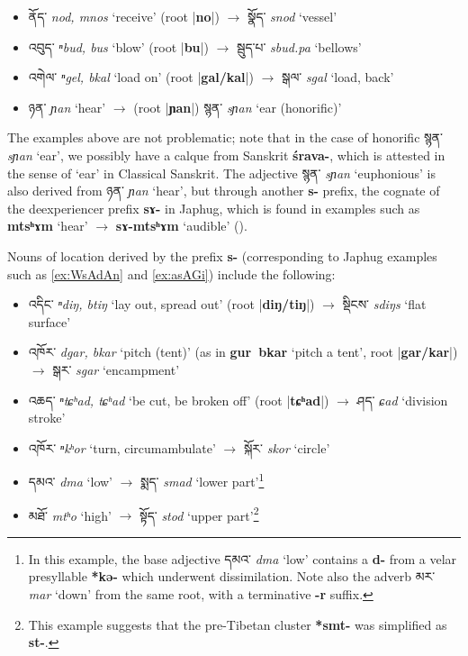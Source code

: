 \documentclass[oneside,a4paper,11pt]{article}
\newcommand{\ipa}[1]{\textbf{{\phon\mbox{#1}}}} %
\newcommand{\tibet}[3]{{\tibetain#1} \textit{\phon#2} `#3'}
\newcommand{\dhat}[1]{|\ipa{#1}|}
\begin{document}
\begin{itemize}
\item \tibet{ནོད་}{nod, mnos}{receive} (root \dhat{no}) $\rightarrow$	\tibet{སྣོད་}{snod}{vessel} 	
\item \tibet{འབུད་}{ⁿbud, bus}{blow} (root \dhat{bu}) $\rightarrow$	\tibet{སྦུད་པ་}{sbud.pa}{bellows} 
\item \tibet{འགེལ་}{ⁿgel, bkal}{load on} (root \dhat{gal/kal}) $\rightarrow$	\tibet{སྒལ་}{sgal}{load, back} 
\item \tibet{ཉན་}{ɲan}{hear} $\rightarrow$	(root \dhat{ɲan}) \tibet{སྙན་}{sɲan}{ear (honorific)} 
\end{itemize}

The examples above are not problematic; note that in the case of honorific \tibet{སྙན་}{sɲan}{ear}, we possibly have a calque from Sanskrit \ipa{śrava-}, which is attested in the sense of `ear' in Classical Sanskrit. The adjective \tibet{སྙན་}{sɲan}{euphonious} is also derived from \tibet{ཉན་}{ɲan}{hear}, but through another \ipa{s-} prefix, the cognate of the deexperiencer prefix \ipa{sɤ-} in Japhug, which is found in examples such as \ipa{mtsʰɤm} `hear' $\rightarrow$  \ipa{sɤ-mtsʰɤm} `audible' (\citealt{jacques12demotion}).

Nouns of location derived by the prefix \ipa{s-} (corresponding to Japhug examples such as \ref{ex:WsAdAn} and \ref{ex:asAGi}) include the following:

\begin{itemize}
\item \tibet{འདིང་}{ⁿdiŋ, btiŋ}{lay out, spread out} (root \dhat{diŋ/tiŋ}) $\rightarrow$	\tibet{སྡིངས་}{sdiŋs}{flat surface} 
\item \tibet{འཁོར་}{dgar, bkar}{pitch (tent)} (as in \ipa{gur bkar} `pitch a tent', root \dhat{gar/kar}) $\rightarrow$	\tibet{སྒར་}{sgar}{encampment} 
\item \tibet{འཆད་}{ⁿtɕʰad, tɕʰad}{be cut, be broken off} (root \dhat{tɕʰad}) $\rightarrow$	\tibet{ཤད་}{ɕad}{division stroke} 
\item \tibet{འཁོར་}{ⁿkʰor}{turn, circumambulate} $\rightarrow$	\tibet{སྐོར་}{skor}{circle} 
\item \tibet{དམའ་}{dma}{low} $\rightarrow$	\tibet{སྨད་}{smad}{lower part}\footnote{In this example, the base adjective \tibet{དམའ་}{dma}{low} contains a \ipa{d-} from a velar presyllable \ipa{*kə-} which underwent dissimilation. Note also the adverb \tibet{མར་}{mar}{down} from the same root, with a terminative \ipa{-r} suffix. }
\item \tibet{མཐོ་}{mtʰo}{high} $\rightarrow$	\tibet{སྟོད་}{stod}{upper part}\footnote{This example suggests that the pre-Tibetan cluster \ipa{*smt-} was simplified as \ipa{st-}. }
\end{itemize}
 
\end{document}
